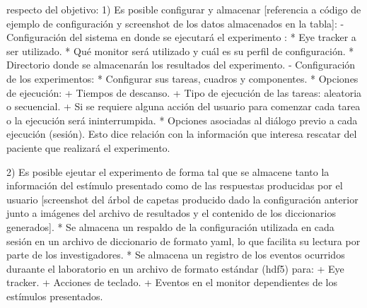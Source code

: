 \documentclass[\main/main.tex]{subfiles}
\begin{document}
	



	respecto del objetivo:
		1) Es posible configurar y almacenar [referencia a código de ejemplo de configuración y screenshot de los datos almacenados en la tabla]:
			- Configuración del sistema en donde se ejecutará el experimento :
				* Eye tracker a ser utilizado.
				* Qué monitor será utilizado y cuál es su perfil de configuración.
				* Directorio donde se almacenarán los resultados del experimento.
			- Configuración de los experimentos:
				* Configurar sus tareas, cuadros y componentes.
				* Opciones de ejecución:
					+ Tiempos de descanso.
					+ Tipo de ejecución de las tareas: aleatoria o secuencial.
					+ Si se requiere alguna acción del usuario para comenzar cada tarea o la ejecución será ininterrumpida.
				* Opciones asociadas al diálogo previo a cada ejecución (sesión). Esto dice relación con la información que interesa rescatar del paciente que realizará el experimento.

		2) Es posible ejeutar el experimento de forma tal que se almacene tanto la información del estímulo presentado como de las respuestas producidas por el usuario [screenshot del árbol de capetas producido dado la configuración anterior junto a imágenes del archivo de resultados y el contenido de los diccionarios generados].
			* Se almacena un respaldo de la configuración utilizada en cada sesión en un archivo de diccionario de formato yaml, lo que facilita su lectura por parte de los investigadores.
			* Se almacena un registro de los eventos ocurridos duraante el laboratorio en un archivo de formato estándar (hdf5) para:
				+ Eye tracker.
				+ Acciones de teclado.  
				+ Eventos en el monitor dependientes de los estímulos presentados.

\end{document}
